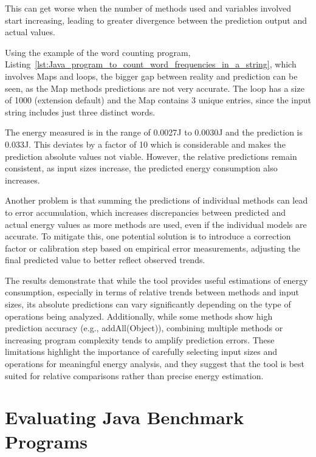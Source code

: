 This can get worse when the number of methods used and variables involved start increasing, leading to greater divergence between the prediction output and actual values. 

Using the example of the word counting program, Listing~\ref{lst:Java_program_to_count_word_frequencies_in_a_string}, which involves Maps and loops, the bigger gap between reality and prediction can be seen, as the Map methods predictions are not very accurate. The loop has a size of 1000 (extension default) and the Map contains 3 unique entries, since the input string includes just three distinct words.

The energy measured is in the range of 0.0027J to 0.0030J and the prediction is 0.033J. This deviates by a factor of 10 which is considerable and makes the prediction absolute values not viable. However, the relative predictions remain consistent, as input sizes increase, the predicted energy consumption also increases.

Another problem is that summing the predictions of individual methods can lead to error accumulation, which increases discrepancies between predicted and actual energy values as more methods are used, even if the individual models are accurate. To mitigate this, one potential solution is to introduce a correction factor or calibration step based on empirical error measurements, adjusting the final predicted value to better reflect observed trends.

The results demonstrate that while the tool provides useful estimations of energy consumption, especially in terms of relative trends between methods and input sizes, its absolute predictions can vary significantly depending on the type of operations being analyzed. Additionally, while some methods show high prediction accuracy (e.g., addAll(Object)), combining multiple methods or increasing program complexity tends to amplify prediction errors. These limitations highlight the importance of carefully selecting input sizes and operations for meaningful energy analysis, and they suggest that the tool is best suited for relative comparisons rather than precise energy estimation.






\section{Evaluating Java Benchmark Programs} \label{sec:evaluating_java_benchmark_programs}

